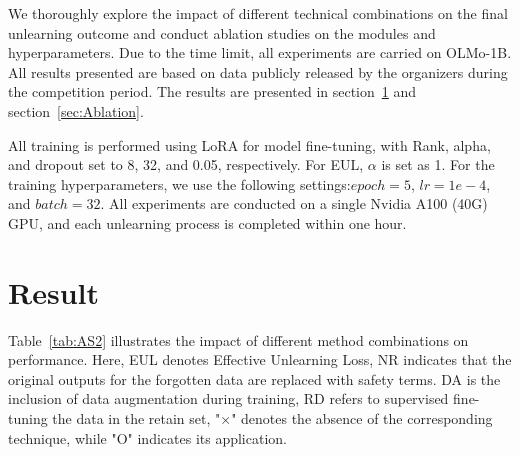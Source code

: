 \documentclass[11pt]{article}
\begin{document}

We thoroughly explore the impact of different technical combinations on the final unlearning outcome and conduct ablation studies on the modules and hyperparameters. Due to the time limit, all experiments are carried on OLMo-1B. All results presented are based on data publicly released by the organizers during the competition period. The results are presented in section~\ref{sec:Result} and section~\ref{sec:Ablation}.

All training is performed using LoRA \cite{hu2022lora} for model fine-tuning, with Rank, alpha, and dropout set to 8, 32, and 0.05, respectively. 
For EUL, $\alpha$ is set as 1. For the training hyperparameters, we use the following settings:$epoch=5$, $lr=1e-4$, and $batch=32$. All experiments are conducted on a single Nvidia A100 (40G) GPU, and each unlearning process is completed within one hour.

\section{Result}
\label{sec:Result}



Table~\ref{tab:AS2} illustrates the impact of different method combinations on performance. Here, EUL denotes Effective Unlearning Loss, NR indicates that the original outputs for the forgotten data are replaced with safety terms. DA is the inclusion of data augmentation during training, RD refers to supervised fine-tuning the data in the retain set,
"×" denotes the absence of the corresponding technique, while "O" indicates its application.
\end{document}
